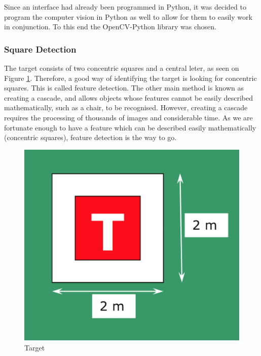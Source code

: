 \documentclass[11pt]{article}
\begin{document}
Since an interface had already been programmed in Python, it was decided to program the computer vision in Python as well to allow for them to easily work in conjunction. To this end the OpenCV-Python library was chosen.

\subsubsection{Square Detection}
The target consists of two concentric squares and a central leter, as seen on Figure \ref{fig:target}\cite{IMechE_rules}. Therefore, a good way of identifying the target is looking for concentric squares. This is called feature detection. The other main method is known as creating a cascade, and allows objects whose features cannot be easily described mathematically, such as a chair, to be recognised. However, creating a cascade requires the processing of thousands of images and considerable time. As we are fortunate enough to have a feature which can be described easily mathematically (concentric squares), feature detection is the way to go.

\begin{figure}
    \begin{center}
        \includegraphics[width=0.48\linewidth]{IMechE_target}
        \caption{Target}
        \label{fig:target}
    \end{center}
\end{figure}
\end{document}

